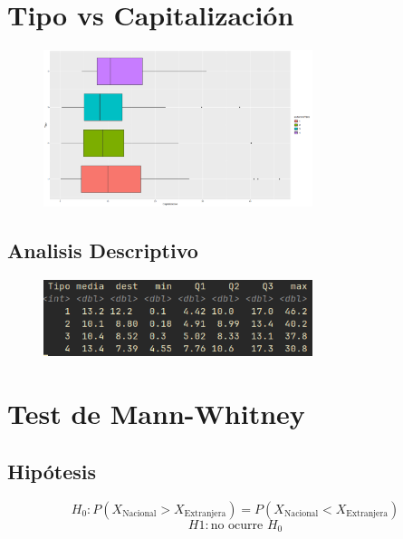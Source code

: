\documentclass{article}
\begin{document}
    \newpage

    \section{Tipo vs Capitalizaci\'on}

    \begin{figure}[ht]
        \centering
        \includegraphics[width=0.7\textwidth]{../imgs/img2.png}
    \end{figure}
    
    \subsection{Analisis Descriptivo}

    \begin{figure}[ht]
        \centering
        \includegraphics[width=0.7\textwidth]{../imgs/screenshot2.png}
    \end{figure}

    \section{Test de Mann-Whitney}
    \subsection{Hip\'otesis}
    \begin{equation}
        H_0:P(X_\text{Nacional} > X_\text{Extranjera}) = P(X_\text{Nacional} < X_\text{Extranjera})
    \end{equation}
    \begin{equation}
        H1: \text{no ocurre } H_0
    \end{equation}
\end{document}
